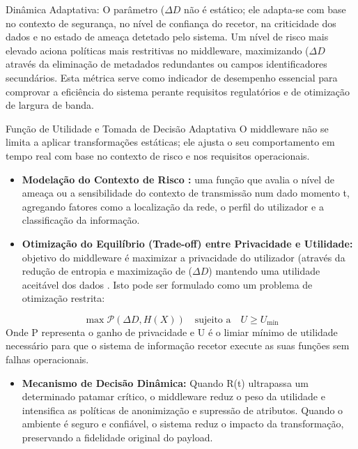 \documentclass[12pt,reqno, twoside]{amsbook}
\makeatletter
\def\section{\@startsection{section}{1}%
      \z@{.5\linespacing\@plus.7\linespacing}{.25\linespacing}%
      {\normalfont\bfseries\flushleft}}
\theoremstyle{plain}
\numberwithin{equation}{chapter}
\numberwithin{table}{chapter}
\numberwithin{figure}{chapter}
\numberwithin{section}{chapter}
\makeatother
\begin{document}
\section {Dinâmica Adaptativa:}
\noindent 	O parâmetro ($\Delta D$  não é estático; ele adapta-se com base no contexto de segurança, no nível de confiança do recetor, na criticidade dos dados e no estado de ameaça detetado pelo sistema.
Um nível de risco mais elevado aciona políticas mais restritivas no middleware, maximizando ($\Delta D$ através da eliminação de metadados redundantes ou campos identificadores secundários.
Esta métrica serve como indicador de desempenho essencial para comprovar a eficiência do sistema perante requisitos regulatórios e de otimização de largura de banda.

\section{Função de Utilidade e Tomada de Decisão Adaptativa}
\noindent O middleware não se limita a aplicar transformações estáticas; ele ajusta o seu comportamento em tempo real com base no contexto de risco e nos requisitos operacionais.

\begin{itemize}[leftmargin=*]
      \item \textbf{Modelação do Contexto de Risco :} uma função que avalia o nível de ameaça ou a sensibilidade do contexto de transmissão num dado momento t, agregando fatores como a localização da rede, o perfil do utilizador e a classificação da informação.
      \item \textbf{Otimização do Equilíbrio (Trade-off) entre Privacidade e Utilidade: }objetivo do middleware é maximizar a privacidade do utilizador (através da redução de entropia e maximização de ($\Delta D$) mantendo uma utilidade aceitável dos dados . Isto pode ser formulado como um problema de otimização restrita:
\end{itemize}

\begin{equation}
    \max \mathcal{P}(\Delta D, H(X)) \quad \text{sujeito a} \quad U \ge U_{\text{min}}
\end{equation}
\noindent Onde {P} representa o ganho de privacidade e {U} é o limiar mínimo de utilidade necessário para que o sistema de informação recetor execute as suas funções sem falhas operacionais.
\begin{itemize}[leftmargin=*]
          \item \textbf{Mecanismo de Decisão Dinâmica:} 	Quando R(t) ultrapassa um determinado patamar crítico, o middleware reduz o peso da utilidade e intensifica as políticas de anonimização e supressão de atributos.
Quando o ambiente é seguro e confiável, o sistema reduz o impacto da transformação, preservando a fidelidade original do payload.

\end{itemize}
\end{document}
